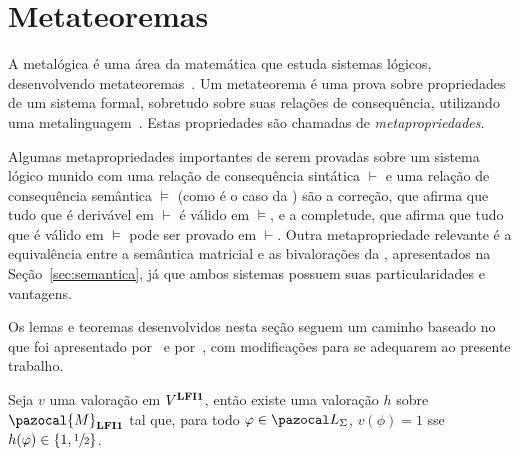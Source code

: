         
                
\section{Metateoremas}\label{sec:metateoremas}
      A metalógica é uma área da matemática que estuda sistemas lógicos, desenvolvendo metateoremas~\cite{Jacquette2002-JACACT-7}. Um metateorema é uma prova sobre propriedades de um sistema formal, sobretudo sobre suas relações de consequência, utilizando uma metalinguagem~\cite{Tarski1956-TARLSM,Barile_2024}. Estas propriedades são chamadas de \textit{metapropriedades}. 
    
    Algumas metapropriedades importantes de serem provadas sobre um sistema lógico munido com uma relação de consequência sintática $\vdash$ e uma relação de consequência semântica $\vDash$ (como é o caso da \lfium{}) são a correção, que afirma que tudo que é derivável em $\vdash$ é válido em $\vDash$, e a completude, que afirma que tudo que é válido em $\vDash$ pode ser provado em $\vdash$. Outra metapropriedade relevante é a equivalência entre a semântica matricial e as bivalorações da \lfium{}, apresentados na Seção~\ref{sec:semantica}, já que ambos sistemas possuem suas particularidades e vantagens. 
    
    Os lemas e teoremas desenvolvidos nesta seção seguem um caminho baseado no que foi apresentado por~ e por~, com modificações para se adequarem ao presente trabalho.


    \begin{lema}\label{lem:matval}
        Seja $v$ uma valoração em $V^{{\normalfont\textbf{LFI1}}}$, então existe uma valoração $h$ sobre $\pazocal{M}_{\lfium}$ tal que, para todo $\phi \in \ling{}$, $v(\phi) = 1$ sse $h(\varphi) \in \{1, \sfrac{1}{2}{}\}$.
    \end{lema}

